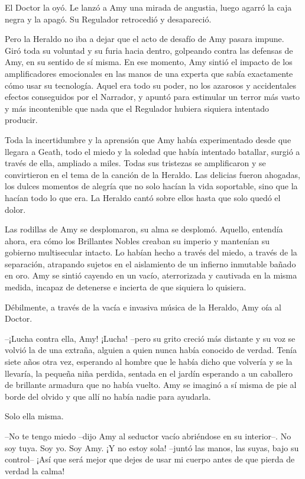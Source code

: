 {El Doctor la oyó. Le lanzó a Amy una mirada de angustia, luego agarró
la caja negra y la apagó. Su Regulador retrocedió y desapareció.}

{Pero la Heraldo no iba a dejar que el acto de desafío de Amy pasara
	impune. Giró toda su voluntad y su furia hacia dentro, golpeando contra
	las defensas de Amy, en su sentido de sí misma. En ese momento, Amy
	sintió el impacto de los amplificadores emocionales en las manos de una
	experta que sabía exactamente cómo usar su tecnología. Aquel era todo su
	poder, no los azarosos y accidentales efectos conseguidos por el
	Narrador, y apuntó para estimular un terror más vasto y más incontenible
que nada que el Regulador hubiera siquiera intentado producir.}

{Toda la incertidumbre y la aprensión que Amy había experimentado desde
	que llegara a Geath, todo el miedo y la soledad que había intentado
	batallar, surgió a través de ella, ampliado a miles. Todas sus tristezas
	se amplificaron y se convirtieron en el tema de la canción de la
	Heraldo. Las delicias fueron ahogadas, los dulces momentos de alegría
	que no solo hacían la vida soportable, sino que la hacían todo lo que
era. La Heraldo cantó sobre ellos hasta que solo quedó el dolor.}

{Las rodillas de Amy se desplomaron, su alma se desplomó. Aquello,
	entendía ahora, era cómo los Brillantes Nobles creaban su imperio y
	mantenían su gobierno multisecular intacto. Lo habían hecho a través del
	miedo, a través de la separación, atrapando sujetos en el aislamiento de
	un infierno inmutable bañado en oro. Amy se sintió cayendo en un vacío,
	aterrorizada y cautivada en la misma medida, incapaz de detenerse e
incierta de que siquiera lo quisiera.}

{Débilmente, a través de la vacía e invasiva música de la Heraldo, Amy
oía al Doctor.}

{--¡Lucha contra ella, Amy! ¡Lucha! --pero su grito creció más
	distante y su voz se volvió la de una extraña, alguien a quien nunca
	había conocido de verdad. Tenía siete años otra vez, esperando al hombre
	que le había dicho que volvería y se la llevaría, la pequeña niña
	perdida, sentada en el jardín esperando a un caballero de brillante
	armadura que no había vuelto. Amy se imaginó a sí misma de pie al borde
del olvido y que allí no había nadie para ayudarla.}

{Solo ella misma.}

{--No te tengo miedo --dijo Amy al seductor vacío abriéndose en su
	interior--. No soy tuya. Soy yo. Soy Amy. ¡Y no estoy sola! --juntó las
	manos, las suyas, bajo su control-- ¡Así que será mejor que dejes de
usar mi cuerpo antes de que pierda de verdad la calma!}

